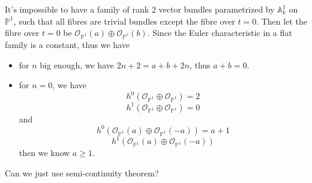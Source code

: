 \documentclass[../main.tex]{subfiles}
\begin{document}
\begin{example}
It's impossible to have a family of rank $2$ vector bundles parametrized by $\mathbb{A}_{k}^{1}$ on $\mathbb{P}^{1}$, such that all fibres are trivial bundles except the fibre over $t=0$. Then let the fibre over $t=0$ be $\mathcal{O}_{\mathbb{P}^{1}}(a)\oplus \mathcal{O}_{\mathbb{P}^{1}}(b)$. Since the Euler characteristic in a flat family is a constant, thus we have 
\begin{itemize}
    \item for $n$ big enough, we have $2n+2=a+b+2n$, thus $a+b=0$.
    \item for $n=0$, we have 
    $$h^{0}(\mathcal{O}_{\mathbb{P}^{1}}\oplus \mathcal{O}_{\mathbb{P}^{1}})=2$$
    $$h^{1}(\mathcal{O}_{\mathbb{P}^{1}}\oplus \mathcal{O}_{\mathbb{P}^{1}})=0$$
    and 
    $$h^{0}(\mathcal{O}_{\mathbb{P}^{1}}(a)\oplus \mathcal{O}_{\mathbb{P}^{1}}(-a))=a+1$$
    $$h^{1}(\mathcal{O}_{\mathbb{P}^{1}}(a)\oplus \mathcal{O}_{\mathbb{P}^{1}}(-a))$$
    then we know $a\geq 1$.
\end{itemize}
\end{example}
\begin{remark}
Can we just use semi-continuity theorem?
\end{remark}
\end{document}
